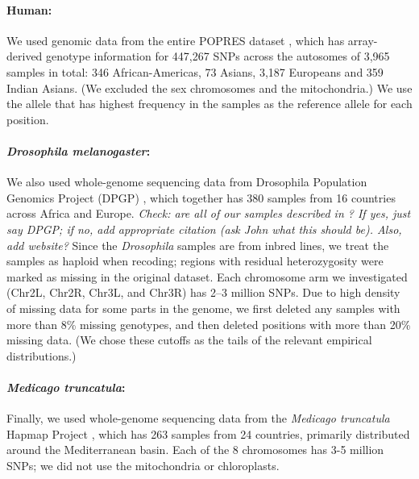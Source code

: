 \documentclass[11pt, oneside]{article}   	%
\newcommand{\plr}[1]{{\em \color{blue} #1}}
\begin{document}
\paragraph{Human:}
We used genomic data from the entire POPRES dataset \citep{nelson2008population},
which has array-derived genotype information for 447,267 SNPs across the autosomes
of 3,965 samples in total: 346 African-Americas, 73 Asians, 3,187 Europeans and 359 Indian Asians.
(We excluded the sex chromosomes and the mitochondria.)
We use the allele that has highest frequency in the samples as the reference allele for each position. 

\paragraph{\textit{Drosophila melanogaster}:}
We also used whole-genome sequencing data from Drosophila Population Genomics Project (DPGP) \citep{lack2015drosophila}, 
which together has 380 samples from 16 countries across Africa and Europe.
\plr{Check: are all of our samples described in \citet{lack2015drosophila}? If yes, just say DPGP; if no, add appropriate citation (ask John what this should be). Also, add website?}
Since the \textit{Drosophila} samples are from inbred lines, we treat the samples as haploid when recoding;
regions with residual heterozygosity were marked as missing in the original dataset.
Each chromosome arm we investigated (Chr2L, Chr2R, Chr3L, and Chr3R) has 2--3 million SNPs.
Due to high density of missing data for some parts in the genome, 
we first deleted any samples with more than 8\% missing genotypes, 
and then deleted positions with more than 20\% missing data. 
(We chose these cutoffs as the tails of the relevant empirical distributions.)

\paragraph{\textit{Medicago truncatula}:}
Finally, we used whole-genome sequencing data from the \textit{Medicago truncatula} Hapmap Project \citep{tang2014improved},
which has 263 samples from 24 countries,
primarily distributed around the Mediterranean basin.
Each of the 8 chromosomes has 3-5 million SNPs;
we did not use the mitochondria or chloroplasts.
\end{document}
